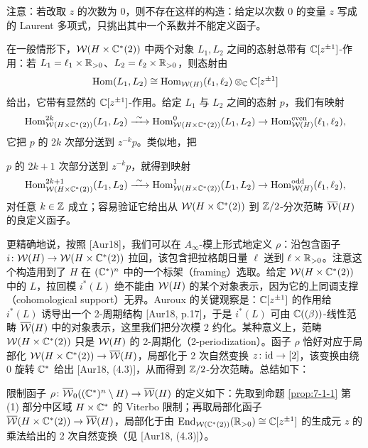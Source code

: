 注意：若改取 $z$ 的次数为 0，则不存在这样的构造：给定以次数 0 的变量 $z$ 写成的 Laurent 多项式，只挑出其中一个系数并不能定义函子。

在一般情形下，$\mathcal{W}(H\times\mathbb{C}^*(2))$ 中两个对象 $L_1,L_2$ 之间的态射总带有 $\mathbb{C}[z^{\pm1}]$-作用：若 $L_1=\ell_1\times\mathbb{R}_{>0}$、$L_2=\ell_2\times\mathbb{R}_{>0}$，则态射由
\[
\operatorname{Hom}(L_1,L_2)\cong\operatorname{Hom}_{\mathcal{W}(H)}(\ell_1,\ell_2)\otimes_{\mathbb{C}}\mathbb{C}[z^{\pm1}]
\]
给出，它带有显然的 $\mathbb{C}[z^{\pm1}]$-作用。给定 $L_1$ 与 $L_2$ 之间的态射 $p$，我们有映射
\[
\Hom^{2k}_{\cW(H\times\C^*(2))}(L_1,L_2)\xrightarrow{\ \sim\ }\Hom^{0}_{\cW(H\times\C^*(2))}(L_1,L_2)\to\Hom^{\mathrm{even}}_{\cW(H)}(\ell_1,\ell_2),
\]
它把 $p$ 的 $2k$ 次部分送到 $z^{-k}p$。类似地，把

$p$ 的 $2k+1$ 次部分送到 $z^{-k}p$，就得到映射
\[
\Hom^{2k+1}_{\cW(H\times\C^*(2))}(L_1,L_2)\xrightarrow{\ \sim\ }\Hom^{1}_{\cW(H\times\C^*(2))}(L_1,L_2)\to\Hom^{\mathrm{odd}}_{\cW(H)}(\ell_1,\ell_2),
\]
对任意 $k\in\mathbb{Z}$ 成立；容易验证它给出从 $\mathcal{W}(H\times\mathbb{C}^*(2))$ 到 $\mathbb{Z}/2$-分次范畴 $\overline{\mathcal{W}}(H)$ 的良定义函子。

更精确地说，按照 [Aur18]，我们可以在 $A_\infty$-模上形式地定义 $\rho$：沿包含函子 $i\colon\mathcal{W}(H)\to\mathcal{W}(H\times\mathbb{C}^*(2))$ 拉回，该包含把拉格朗日量 $\ell$ 送到 $\ell\times\mathbb{R}_{>0}$。注意这个构造用到了 $H$ 在 $(\mathbb{C}^*)^n$ 中的一个标架（framing）选取。给定 $\mathcal{W}(H\times\mathbb{C}^*(2))$ 中的 $L$，拉回模 $i^*(L)$ 绝不能由 $\mathcal{W}(H)$ 的某个对象表示，因为它的上同调支撑（cohomological support）无界。Auroux 的关键观察是：$\mathbb{C}[z^{\pm1}]$ 的作用给 $i^*(L)$ 诱导出一个 2-周期结构 [Aur18, p.17]，于是 $i^*(L)$ 可由 $\mathbb{C}((\beta))$-线性范畴 $\overline{\mathcal{W}}(H)$ 中的对象表示，这里我们把分次模 2 约化。某种意义上，范畴 $\mathcal{W}(H\times\mathbb{C}^*(2))$ 只是 $\mathcal{W}(H)$ 的 2-周期化（2-periodization）。函子 $\rho$ 恰好对应于局部化 $\mathcal{W}(H\times\mathbb{C}^*(2))\to\overline{\mathcal{W}}(H)$，局部化于 2 次自然变换 $z\colon\mathrm{id}\to[2]$，该变换由绕 $0$ 旋转 $\mathbb{C}^*$ 给出 [Aur18, (4.3)]，从而得到 $\mathbb{Z}/2$-分次范畴。总结如下：

\begin{definition}\label{def:8-2-3}
限制函子 $\rho\colon\overline{\mathcal{W}}_0((\mathbb{C}^*)^n\setminus H)\to\overline{\mathcal{W}}(H)$ 的定义如下：先取到命题 \ref{prop:7-1-1} 第 (1) 部分中区域 $H\times\mathbb{C}^*$ 的 Viterbo 限制；再取局部化函子 $\overline{\mathcal{W}}(H\times\mathbb{C}^*(2))\to\overline{\mathcal{W}}(H)$，局部化于由 $\operatorname{End}_{\mathcal{W}(\mathbb{C}^*(2))}(\mathbb{R}_{>0})\cong\mathbb{C}[z^{\pm1}]$ 的生成元 $z$ 的乘法给出的 2 次自然变换（见 [Aur18, (4.3)]）。
\end{definition}


